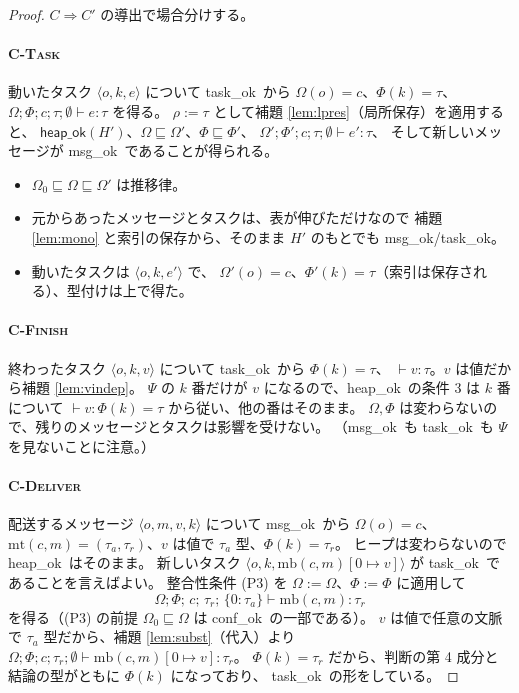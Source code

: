 \documentclass[11pt,a4paper]{ltjsarticle}
\theoremstyle{definition}
\theoremstyle{remark}
\newcommand{\Om}{\Omega}
\newcommand{\Ph}{\Phi}
\newcommand{\Ps}{\Psi}
\newcommand{\mtab}{\mathrm{mt}}
\newcommand{\mbody}{\mathrm{mb}}
\newcommand{\heapok}{\textsf{heap\_ok}}
\newcommand{\msgok}{\textsf{msg\_ok}}
\newcommand{\taskok}{\textsf{task\_ok}}
\newcommand{\confok}{\textsf{conf\_ok}}
\newcommand{\cstep}{\Longrightarrow}
\newcommand{\subs}[2]{[#1 \mapsto #2]}
\begin{document}
\begin{proof}
$C \cstep C'$ の導出で場合分けする。

\paragraph{\textsc{C-Task}}
動いたタスク $\langle o,k,e\rangle$ について \taskok\ から
$\Om(o) = c$、$\Ph(k) = \tau$、$\Om;\Ph;c;\tau;\emptyset \vdash e : \tau$ を得る。
$\rho := \tau$ として補題 \ref{lem:lpres}（局所保存）を適用すると、
$\heapok(H')$、$\Om \sqsubseteq \Om'$、$\Ph \sqsubseteq \Ph'$、
$\Om';\Ph';c;\tau;\emptyset \vdash e' : \tau$、
そして新しいメッセージが \msgok\ であることが得られる。
\begin{itemize}
\item $\Om_0 \sqsubseteq \Om \sqsubseteq \Om'$ は推移律。
\item 元からあったメッセージとタスクは、表が伸びただけなので
  補題 \ref{lem:mono} と索引の保存から、そのまま $H'$ のもとでも \msgok/\taskok。
\item 動いたタスクは $\langle o,k,e'\rangle$ で、
  $\Om'(o) = c$、$\Ph'(k) = \tau$（索引は保存される）、型付けは上で得た。
\end{itemize}

\paragraph{\textsc{C-Finish}}
終わったタスク $\langle o,k,v\rangle$ について \taskok\ から $\Ph(k) = \tau$、
$\vdash v : \tau$。$v$ は値だから補題 \ref{lem:vindep}。
$\Ps$ の $k$ 番だけが $v$ になるので、\heapok\ の条件 3 は
$k$ 番について $\vdash v : \Ph(k) = \tau$ から従い、他の番はそのまま。
$\Om,\Ph$ は変わらないので、残りのメッセージとタスクは影響を受けない。
（\msgok\ も \taskok\ も $\Ps$ を見ないことに注意。）

\paragraph{\textsc{C-Deliver}}
配送するメッセージ $\langle o,m,v,k\rangle$ について \msgok\ から
$\Om(o) = c$、$\mtab(c,m) = (\tau_a,\tau_r)$、$v$ は値で $\tau_a$ 型、$\Ph(k) = \tau_r$。
ヒープは変わらないので \heapok\ はそのまま。
新しいタスク $\langle o,k,\mbody(c,m)\subs{0}{v}\rangle$ が \taskok\ であることを言えばよい。
整合性条件 (P3) を $\Om := \Om$、$\Ph := \Ph$ に適用して
\[
  \Om;\Ph;\,c;\,\tau_r;\,\{0{:}\tau_a\} \vdash \mbody(c,m) : \tau_r
\]
を得る（(P3) の前提 $\Om_0 \sqsubseteq \Om$ は \confok\ の一部である）。
$v$ は値で任意の文脈で $\tau_a$ 型だから、補題 \ref{lem:subst}（代入）より
$\Om;\Ph;c;\tau_r;\emptyset \vdash \mbody(c,m)\subs{0}{v} : \tau_r$。
$\Ph(k) = \tau_r$ だから、判断の第 4 成分と結論の型がともに $\Ph(k)$ になっており、
\taskok\ の形をしている。
\end{proof}
\end{document}
